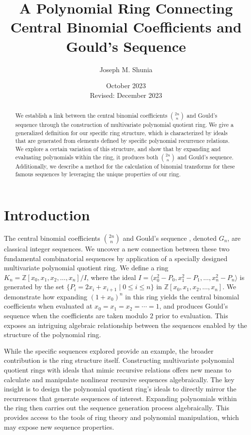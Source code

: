 \documentclass{article}
\theoremstyle{plain}
\theoremstyle{definition}
\newcommand{\K}{K}
\begin{document}
\title{A Polynomial Ring Connecting Central Binomial Coefficients and Gould's Sequence}
\author{Joseph M. Shunia}
\date{October 2023 \\ \small Revised: December 2023 \normalsize}
\maketitle

\begin{abstract}
We establish a link between the central binomial coefficients $\binom{2n}{n}$ and Gould's sequence through the construction of multivariate polynomial quotient ring. We give a generalized definition for our specific ring structure, which is characterized by ideals that are generated from elements defined by specific polynomial recurrence relations. We explore a certain variation of this structure, and show that by expanding and evaluating  polynomials within the ring, it produces both $\binom{2n}{n}$ and Gould's sequence. Additionally, we describe a method for the calculation of binomial transforms for these famous sequences by leveraging the unique properties of our ring.
\end{abstract}

\section{Introduction}
The central binomial coefficients $\binom{2n}{n}$ \cite{A000984} and Gould's sequence \cite{A001316}, denoted $G_n$, are classical integer sequences. We uncover a new connection between these two fundamental combinatorial sequences by application of a specially designed multivariate polynomial quotient ring. We define a ring $\K_n = \mathbb{Z}[x_0, x_1, x_2, \ldots, x_n]/I$, where the ideal $I = \langle x_0^2 - P_0, x_1^2 - P_1, \ldots, x_n^2 - P_n \rangle$ is generated by the set $\{P_i = 2x_i + x_{i+1} \mid 0 \leq i \leq n \}$ in $\mathbb{Z}[x_0, x_1, x_2, \ldots, x_n]$. We demonstrate how expanding $(1 + x_0)^n$ in this ring yields the central binomial coefficients when evaluated at $x_0=x_1=x_2=\cdots=1$, and produces Gould's sequence when the coefficients are taken modulo $2$ prior to evaluation. This exposes an intriguing algebraic relationship between the sequences enabled by the structure of the polynomial ring.

While the specific sequences explored provide an example, the broader contribution is the ring structure itself. Constructing multivariate polynomial quotient rings with ideals that mimic recursive relations offers new means to calculate and manipulate nonlinear recursive sequences algebraically. The key insight is to design the polynomial quotient ring's ideals to directly mirror the recurrences that generate sequences of interest. Expanding polynomials within the ring then carries out the sequence generation process algebraically. This provides access to the tools of ring theory and polynomial manipulation, which may expose new sequence properties.
\end{document}
